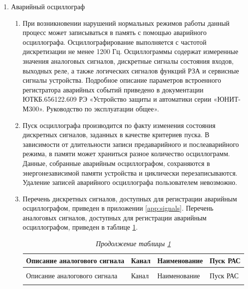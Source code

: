 \begin{enumerate}
\begin{enumerate}
\end{enumerate}

\item Аварийный осциллограф
\begin{enumerate}
\item
При возникновении нарушений нормальных режимов работы данный процесс может записываться в память с помощью аварийного осциллографа. Осциллографирование выполняется с частотой дискретизации не менее 1200 Гц. Осциллограммы содержат измеренные значения аналоговых сигналов, дискретные сигналы состояния входов, выходных реле, а также логических сигналов функций РЗА и сервисные сигналы устройства. Подробное описание параметров встроенного регистратора аварийных событий приведено в документации ЮТКБ.656122.609 РЭ «Устройство защиты и автоматики серии «ЮНИТ-М300». Руководство по эксплуатации общее».
\item
Пуск осциллографа производится по факту изменения состояния дискретных сигналов, заданных в качестве критериев пуска. В зависимости от длительности записи предаварийного и послеаварийного режима, в памяти может храниться разное количество осциллограмм. Данные, собранные аварийным осциллографом, сохраняются в энергонезависимой памяти устройства и циклически перезаписываются. Удаление записей аварийного осциллографа пользователем невозможно.

\item
Перечень дискретных сигналов, доступных для регистрации аварийным осциллографом, приведен в приложении \ref{app:signals}. Перечень аналоговых сигналов, доступных для регистрации аварийным осциллографом, приведен в таблице \ref{osz:tbl1}.

\setlength{\extrarowheight}{0.05cm}
\small
\begin{longtable}{|>{\centering\arraybackslash}m{6.8cm}|>{\centering\arraybackslash}m{2cm}|>{\centering\arraybackslash}m{5.3cm}|>{\centering\arraybackslash}m{2cm}|}
\caption{Перечень аналоговых сигналов, доступных для регистрации аварийным осциллографом\hfill\vspace{-0.5\baselineskip}}\label{osz:tbl1}\\ 
\hline
\rowcolor{gray!30}
Описание аналогового сигнала & Канал & Наименование  & Пуск РАС \\ 
\hline
\endfirsthead
\caption*{\hspace{3pt}\emph{Продолжение таблицы \ref{osz:tbl1}\hfill\vspace{-0.5\baselineskip}}} \\ %
\hline
\rowcolor{gray!30}
Описание аналогового сигнала & Канал & Наименование  & Пуск РАС \\ 
\endhead
\endfoot
\endlastfoot


\end{longtable}
\end{enumerate}
\end{enumerate}
